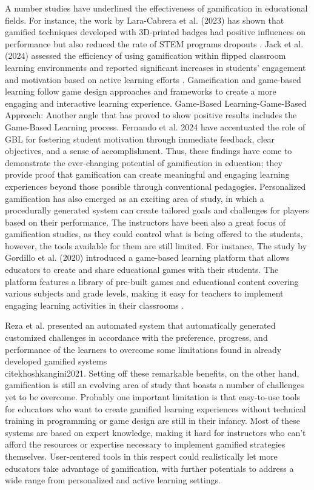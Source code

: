 A number studies have underlined the effectiveness of gamification in educational fields. For instance, the work by Lara-Cabrera et al. (2023) has shown that gamified techniques developed with 3D-printed badges had positive influences on performance but also reduced the rate of STEM programs dropouts \cite{lara2023badges}. Jack et al. (2024) assessed the efficiency of using gamification within flipped classroom learning environments and reported significant increases in students' engagement and motivation based on active learning efforts \cite{jack2024gamification}. Gameification and game-based learning follow game design approaches and frameworks to create a more engaging and interactive learning experience.
Game-Based Learning-Game-Based Approach: Another angle that has proved to show positive results includes the Game-Based Learning process. Fernando et al. 2024 have accentuated the role of GBL for fostering student motivation through immediate feedback, clear objectives, and a sense of accomplishment. Thus, these findings have come to demonstrate the ever-changing potential of gamification in education; they provide proof that gamification can create meaningful and engaging learning experiences beyond those possible through conventional pedagogies. Personalized gamification has also emerged as an exciting area of study, in which a procedurally generated system can create tailored goals and challenges for players based on their performance. The instructors have been also a great focus of gamification studies, as they could control what is being offered to the students, however, the tools available for them are still limited. For instance, The study by Gordillo et al. (2020) introduced a game-based learning platform that allows educators to create and share educational games with their students. The platform features a library of pre-built games and educational content covering various subjects and grade levels, making it easy for teachers to implement engaging learning activities in their classrooms \cite{sgame2020}.

Reza et al. presented an automated system that automatically generated customized challenges in accordance with the preference, progress, and performance of the learners to overcome some limitations found in already developed gamified systems \\cite{khoshkangini2021}. Setting off these remarkable benefits, on the other hand, gamification is still an evolving area of study that boasts a number of challenges yet to be overcome. Probably one important limitation is that easy-to-use tools for educators who want to create gamified learning experiences without technical training in programming or game design are still in their infancy. Most of these systems are based on expert knowledge, making it hard for instructors who can't afford the resources or expertise necessary to implement gamified strategies themselves. User-centered tools in this respect could realistically let more educators take advantage of gamification, with further potentials to address a wide range from personalized and active learning settings.